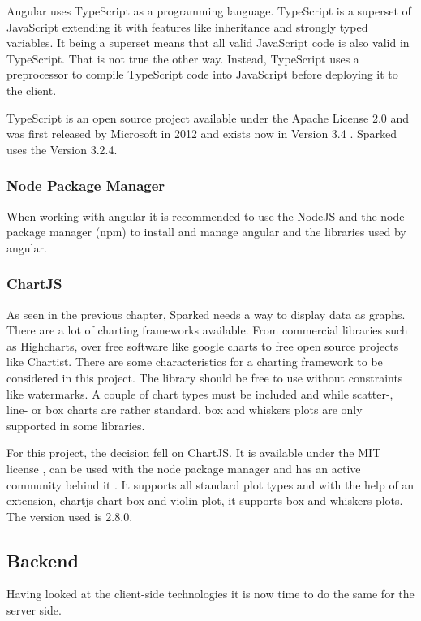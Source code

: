 Angular uses TypeScript as a programming language. TypeScript is a superset of JavaScript extending it with features like inheritance and strongly typed variables. It being a superset means that all valid JavaScript code is also valid in TypeScript. That is not true the other way. Instead, TypeScript uses a preprocessor to compile TypeScript code into JavaScript before deploying it to the client. 

TypeScript is an open source project available under the Apache License 2.0 \cite{typescriptLicense} and was first released by Microsoft in 2012 and exists now in Version 3.4 \cite{typescript}. Sparked uses the Version 3.2.4. 

\subsubsection{Node Package Manager}
When working with angular it is recommended to use the NodeJS and the node package manager (npm) to install and manage angular and the libraries used by angular.

\subsubsection{ChartJS}
As seen in the previous chapter, Sparked needs a way to display data as graphs. There are a lot of charting frameworks available. From commercial libraries such as Highcharts, over free software like google charts to free open source projects like Chartist. There are some characteristics for a charting framework to be considered in this project. The library should be free to use without constraints like watermarks. A couple of chart types must be included and while scatter-, line- or box charts are rather standard, box and whiskers plots are only supported in some libraries. 

For this project, the decision fell on ChartJS. It is available under the MIT license \cite{chartjs}, can be used with the node package manager and has an active community behind it \cite{chartjs-contributors}. It supports all standard plot types and with the help of an extension, chartjs-chart-box-and-violin-plot, it supports box and whiskers plots. The version used is 2.8.0.

\subsection{Backend}
Having looked at the client-side technologies it is now time to do the same for the server side. 
